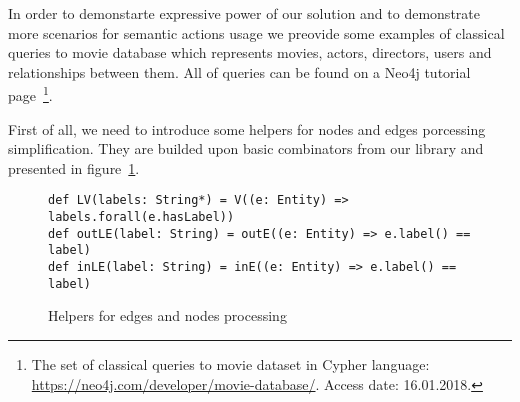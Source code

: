 In order to demonstarte expressive power of our solution and to demonstrate more scenarios for
semantic actions usage we preovide some examples of classical queries to movie database which
represents movies, actors, directors, users and relationships between them.
All of queries can be found on a Neo4j tutorial page~\footnote{The set of classical queries to movie dataset in Cypher language: \url{https://neo4j.com/developer/movie-database/}. Access date: 16.01.2018.}.

First of all, we need to introduce some helpers for nodes and edges porcessing simplification.
They are builded upon basic combinators from our library and presented in figure~\ref{fig:helpers}.

\begin{figure}[h]
\begin{lstlisting}
def LV(labels: String*) = V((e: Entity) => labels.forall(e.hasLabel))
def outLE(label: String) = outE((e: Entity) => e.label() == label)
def inLE(label: String) = inE((e: Entity) => e.label() == label)
\end{lstlisting}
\caption{Helpers for edges and nodes processing}
\label{fig:helpers}
\end{figure}

